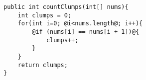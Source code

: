 \begin{lstlisting}[style=customJava]
public int countClumps(int[] nums){
    int clumps = 0;
    for(int i=0; @i<nums.length@; i++){
        @if (nums[i] == nums[i + 1])@{
            clumps++;
        }
    }
    return clumps;
}
\end{lstlisting}
